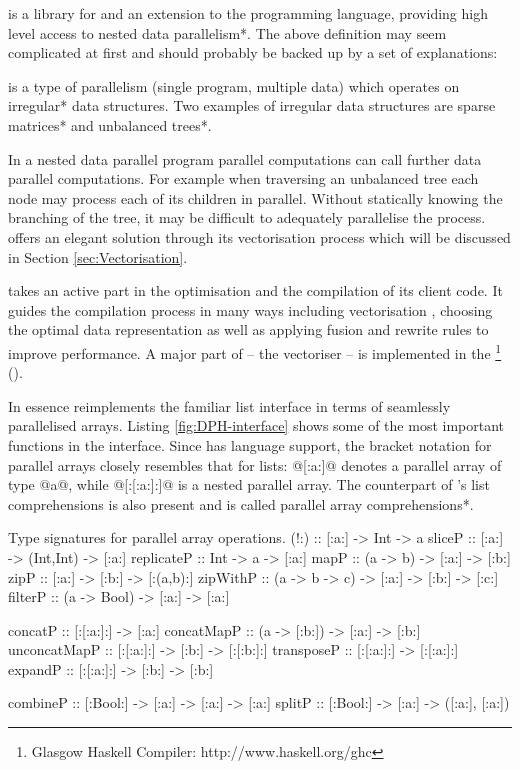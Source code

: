 \documentclass[preamble.tex]{subfiles}
\begin{document}
\idph{} is a library for and an extension to the \Haskell programming language, providing high level access to \*nested data parallelism*. The above definition may seem complicated at first and should probably be backed up by a set of explanations:

 is a type of  parallelism (single program, multiple data) which operates on \*irregular* data structures. Two examples of irregular data structures are \*sparse matrices* and \*unbalanced trees*.

In a nested data parallel program parallel computations can call further data parallel computations. For example when traversing an unbalanced tree each node may process each of its children in parallel. Without statically knowing the branching of the tree, it may be difficult to adequately parallelise the process. \DPH offers an elegant solution through its vectorisation process which will be discussed in Section \ref{sec:Vectorisation}.

\DPH takes an active part in the optimisation and the compilation of its client code. It guides the compilation process in many ways including vectorisation \cite{PLKC08}, choosing the optimal data representation \cite{CDL09} as well as applying fusion \cite{CLP+07} and rewrite rules \cite{PTH01} to improve performance.  A major part of \DPH -- the vectoriser -- is implemented in the \footnote{Glasgow Haskell Compiler: http://www.haskell.org/ghc} (\GHC).

In essence \DPH reimplements the familiar list interface in terms of seamlessly parallelised arrays. Listing \ref{fig:DPH-interface} shows some of the most important functions in the \DPH interface. Since \DPH has language support, the bracket notation for parallel arrays closely resembles that for \Haskell lists: @[:a:]@ denotes a parallel array of type @a@, while @[:[:a:]:]@ is a nested parallel array. The counterpart of \Haskell's list comprehensions is also present and is called \*parallel array comprehensions*.


\begin{hscode2}{Type signatures for parallel array operations. \label{fig:DPH-interface}}
(!:)         :: [:a:] -> Int -> a
sliceP       :: [:a:] -> (Int,Int) -> [:a:]
replicateP   :: Int -> a -> [:a:]
mapP         :: (a -> b) -> [:a:] -> [:b:]
zipP         :: [:a:] -> [:b:] -> [:(a,b):]
zipWithP     :: (a -> b -> c) -> [:a:] -> [:b:] -> [:c:]
filterP      :: (a -> Bool) -> [:a:] -> [:a:]

concatP      :: [:[:a:]:] -> [:a:]
concatMapP   :: (a -> [:b:]) -> [:a:] -> [:b:]
unconcatMapP :: [:[:a:]:] -> [:b:] -> [:[:b:]:]
transposeP   :: [:[:a:]:] -> [:[:a:]:]
expandP      :: [:[:a:]:] -> [:b:] -> [:b:]

combineP     :: [:Bool:] -> [:a:] -> [:a:] -> [:a:]
splitP       :: [:Bool:] -> [:a:] -> ([:a:], [:a:])
\end{hscode2}
\end{document}
